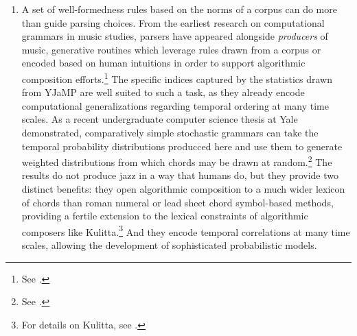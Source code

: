 \begin{enumerate}
I leave open the question of what type of well-formedness rules would best capture the temporal progression behavior of YJaMP or any other jazz corpus, though (as Chapter 1 implies) I am skeptical of the deeply recursive hierarchical and semantic structure Granroth-Wilding and Steedman employ.  But the use of probabilistic grammars based on data-driven lexical categories and the production of temporal progression norms could allow an analyst to produce local parsing interpretants from the otherwise ill-suited type-level statistics given here.  Crucially, the lexical assignments offered here do not encode any pre-conceptions regarding harmonic norms other than that they involve locally-transposed near-verticalities and their relative deployments over time.%

	\item A set of well-formedness rules based on the norms of a corpus can do more than guide parsing choices.  From the earliest research on computational grammars in music studies, parsers have appeared alongside \emph{producers} of music, generative routines which leverage rules drawn from a corpus or encoded based on human intuitions in order to support algorithmic composition efforts.\footnote{See \cite{fernandez2013}.}  The specific indices captured by the statistics drawn from YJaMP are well suited to such a task, as they already encode computational generalizations regarding temporal ordering at many time scales.  As a recent undergraduate computer science thesis at Yale demonstrated, comparatively simple stochastic grammars can take the temporal probability distributions producced here and use them to generate weighted distributions from which chords may be drawn at random.\footnote{See \cite{zitomer2016}.}  The results do not produce jazz in a way that humans do, but they provide two distinct benefits: they open algorithmic composition to a much wider lexicon of chords than roman numeral or lead sheet chord symbol-based methods, providing a fertile extension to the lexical constraints of algorithmic composers like Kulitta.\footnote{For details on Kulitta, see \cite{quick2014}.} And they encode temporal correlations at many time scales, allowing the development of sophisticated probabilistic models.


\end{enumerate}
